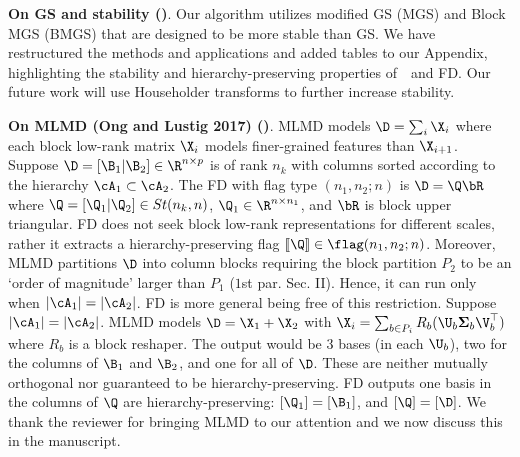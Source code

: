 \documentclass[10pt,twocolumn,letterpaper]{article}
\begin{document}



\noindent \textbf{On GS and stability (\Rone)}.
Our algorithm utilizes modified GS (MGS) and Block MGS (BMGS) that are designed to be more stable than GS. We have restructured the methods and applications and added tables to our Appendix, highlighting the stability and hierarchy-preserving properties of~\algname~and FD. 
Our future work will use Householder transforms to further increase stability. 

\noindent \textbf{On MLMD (Ong and Lustig 2017) (\Rfour)}. MLMD models $\D = \sum_i \X_i$ where each block low-rank matrix $\X_i$ models finer-grained features than $\X_{i+1}$. Suppose $\D = [\B_1|\B_2]\in \R^{n \times p}$ is of rank $n_k$ with columns sorted according to the hierarchy $\cA_1 \subset \cA_2$. The FD with flag type $(n_1,n_2;n)$ is $\D = \Q \bR$ where $\Q = [\Q_1 | \Q_2] \in St(n_k,n)$, $\Q_1 \in \R^{n \times n_1}$, and $\bR$ is block upper triangular. FD does not seek block low-rank representations for different scales, rather it extracts a hierarchy-preserving flag $[\![\Q]\!] \in \flag(n_1,n_2;n)$. Moreover, MLMD partitions $\D$ into column blocks requiring the block partition $P_2$ to be an `order of magnitude' larger than $P_1$ ($1$st par. Sec. II). Hence, it can run only when $|\cA_1| = |\cA_2|$. FD is more general being free of this restriction. Suppose $|\cA_1| = |\cA_2|$. MLMD models $\D = \X_1 + \X_2$ with $\X_i = \sum_{b \in P_i} R_b (\U_b \boldsymbol{\Sigma}_b \V^\top_b)$ where $R_b$ is a block reshaper. The output would be $3$ bases (in each $\U_b$), two for the columns of $\B_1$ and $\B_2$, and one for all of $\D$. These are neither mutually orthogonal nor guaranteed to be hierarchy-preserving. FD outputs one basis in the columns of $\Q$ are hierarchy-preserving: $[\Q_1]=[\B_1]$, and $[\Q] = [\D]$. We thank the reviewer for bringing MLMD to our attention and we now discuss this in the manuscript.
\end{document}
